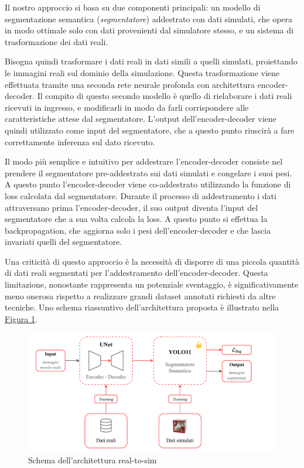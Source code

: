 \documentclass[12pt]{report}
\begin{document}
Il nostro approccio si basa su due componenti principali: un modello di segmentazione semantica (\textit{segmentatore}) addestrato con dati simulati, che opera in modo ottimale solo con dati provenienti dal simulatore stesso, e un sistema di trasformazione dei dati reali.

Bisogna quindi trasformare i dati reali in dati simili a quelli simulati, proiettando le immagini reali sul dominio della simulazione. Questa trasformazione viene effettuata tramite una seconda rete neurale profonda con architettura encoder-decoder. Il compito di questo secondo modello è quello di rielaborare i dati reali ricevuti in ingresso, e modificarli in modo da farli corrispondere alle caratteristiche attese dal segmentatore. L'output dell'encoder-decoder viene quindi utilizzato come input del segmentatore, che a questo punto riuscirà a fare correttamente inferenza sul dato ricevuto.

Il modo più semplice e intuitivo per addestrare l'encoder-decoder consiste nel prendere il segmentatore pre-addestrato sui dati simulati e congelare i suoi pesi. A questo punto l'encoder-decoder viene co-addestrato utilizzando la funzione di loss calcolata dal segmentatore. Durante il processo di addestramento i dati attraversano prima l'encoder-decoder, il suo output diventa l'input del segmentatore che a sua volta calcola la loss. A questo punto si effettua la backpropagation, che aggiorna solo i pesi dell'encoder-decoder e che lascia invariati quelli del segmentatore.

Una criticità di questo approccio è la necessità di disporre di una piccola quantità di dati reali segmentati per l'addestramento dell'encoder-decoder. Questa limitazione, nonostante rappresenta un potenziale sventaggio, è significativamente meno onerosa rispetto a realizzare grandi dataset annotati richiesti da altre tecniche. Uno schema riassuntivo dell'architettura proposta è illustrato nella \hyperref[fig:architettura-unet-yolo]{Figura \ref{fig:architettura-unet-yolo}}.

\begin{figure}[t]
	\centering
	\includegraphics[width = \textwidth, clip]{images/unet-yolo-architecture}
	\caption{Schema dell'architettura real-to-sim}
	\label{fig:architettura-unet-yolo}
\end{figure}
\end{document}
